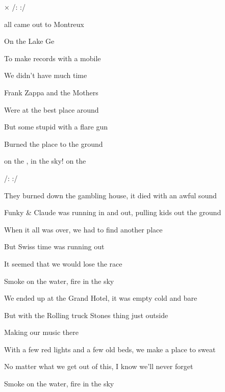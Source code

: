 

× /:         
    :/
\kr

\zs
{} all came out to Montreux

On the Lake Ge 

To make records with a mobile

We didn't have much time

Frank Zappa and the Mothers

Were at the best place around

But some stupid with a flare gun

Burned the place to the ground
\ks

\zr
{} on the ,  in the sky!  on the 

/:             :/
\kr

\zs
They burned down the gambling house,
it died with an awful sound

Funky \& Claude was running in and out,
pulling kids out the ground

When it all was over,
we had to find another place

But Swiss time was running out

It seemed that we would lose the race

Smoke on the water, fire in the sky
\ks

\zs
We ended up at the Grand Hotel,
it was empty cold and bare

But with the Rolling truck Stones thing just outside

Making our music there

With a few red lights and a few old beds,
we make a place to sweat

No matter what we get out of this,
I know we'll never forget

Smoke on the water, fire in the sky
\ks

